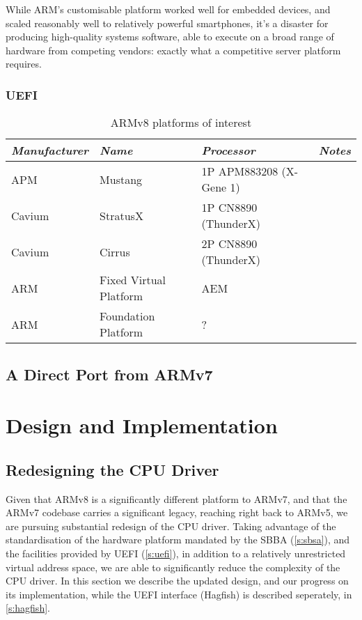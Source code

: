 \documentclass[a4paper,twoside]{report}
\begin{document}
While ARM's customisable platform worked well for embedded devices, and scaled
reasonably well to relatively powerful smartphones, it's a disaster for
producing high-quality systems software, able to execute on a broad range of
hardware from competing vendors: exactly what a competitive server platform
requires.

\subsection{UEFI}\label{s:uefi}

\begin{table}
\begin{center}
\begin{tabular}{llll}
\textit{Manufacturer} & \textit{Name} & \textit{Processor} & \textit{Notes} \\
\hline
APM & Mustang & 1P APM883208 (X-Gene 1) & \\
Cavium & StratusX & 1P CN8890 (ThunderX) & \\
Cavium & Cirrus & 2P CN8890 (ThunderX) & \\
ARM & Fixed Virtual Platform & AEM & \\
ARM & Foundation Platform & ? & \\
\end{tabular}
\end{center}
\caption{ARMv8 platforms of interest}\label{t:platforms}
\end{table}

\section{A Direct Port from ARMv7}

\chapter{Design and Implementation}

\section{Redesigning the CPU Driver}

Given that ARMv8 is a significantly different platform to ARMv7, and that the
ARMv7 codebase carries a significant legacy, reaching right back to ARMv5, we
are pursuing substantial redesign of the CPU driver. Taking advantage of the
standardisation of the hardware platform mandated by the SBBA
(\autoref{s:sbsa}), and the facilities provided by UEFI (\autoref{s:uefi}), in
addition to a relatively unrestricted virtual address space, we are able to
significantly reduce the complexity of the CPU driver.  In this section we
describe the updated design, and our progress on its implementation, while the
UEFI interface (Hagfish) is described seperately, in \autoref{s:hagfish}.
\end{document}
